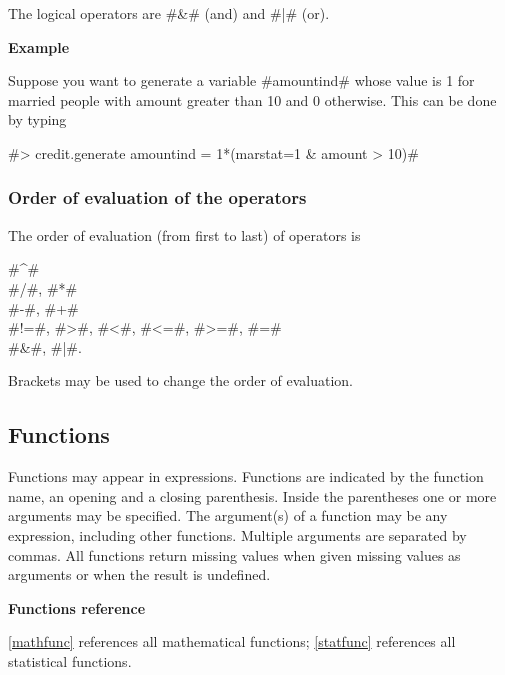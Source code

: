 The logical operators are #&# (and) and #|# (or).

{\bf Example}

Suppose you want to generate a variable #amountind# whose value is
1 for married people with
amount greater than 10 and 0 otherwise. This can be done by typing

#> credit.generate amountind = 1*(marstat=1 & amount > 10)#


\subsubsection{Order of evaluation of the operators}

The order of evaluation (from first to last) of operators is

#^# \\
#/#, #*#\\
#-#, #+#\\
#!=#, #>#, #<#, #<=#, #>=#, #=#\\
#&#, #|#.

Brackets may be used to change the order of evaluation.


\subsection{Functions}

Functions may appear in expressions. Functions are indicated by
the function name, an opening and a closing parenthesis. Inside
the parentheses one or more arguments may be specified. The
argument(s) of a function may be any expression, including other
functions. Multiple arguments are separated by commas. All
functions return missing values when given missing values as
arguments or when the result is undefined.


\bigskip
{\bf Functions reference}

\autoref{mathfunc} references all mathematical functions;
\autoref{statfunc} references all statistical functions.
  
 
 
   


